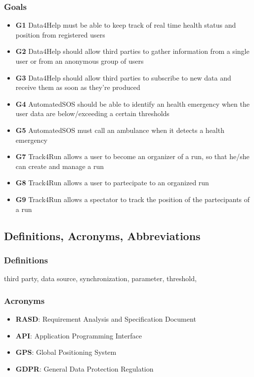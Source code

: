 \subsubsection{Goals}
\begin{itemize}
\item \textbf{G1} Data4Help must be able to keep track of real time health status and position from registered users
\item \textbf{G2} Data4Help should allow third parties to gather information from a single user or from an anonymous group of users
\item \textbf{G3} Data4Help should allow third parties to subscribe to new data and receive them as soon as they're produced
\item \textbf{G4} AutomatedSOS should be able to identify an health emergency when the user data are below/exceeding a certain thresholds
\item \textbf{G5} AutomatedSOS must call an ambulance when it detects a health emergency
\item \textbf{G7} Track4Run allows a user to become an organizer of a run, so that he/she can create and manage a run
\item \textbf{G8} Track4Run allows a user to partecipate to an organized run
\item \textbf{G9} Track4Run allows a spectator to track the position of the partecipants of a run 
\end{itemize}
\subsection{Definitions, Acronyms, Abbreviations}
\subsubsection{Definitions}
third party, data source, synchronization, parameter, threshold,

\subsubsection{Acronyms}
\begin{itemize}
\item \textbf{RASD}: Requirement Analysis and Specification Document
\item \textbf{API}: Application Programming Interface
\item \textbf{GPS}: Global Positioning System
\item \textbf{GDPR}: General Data Protection Regulation
\end{itemize}

